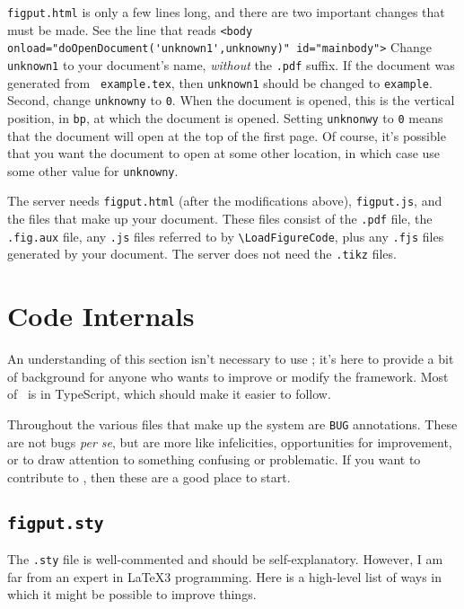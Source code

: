 \documentclass[10pt]{article}
\begin{document}
{\tt figput.html} is only a few lines long, and there are two
important changes that must be made. See the line that reads
\vskip 0.2cm
\noindent\verb!<body onload="doOpenDocument('unknown1',unknowny)" id="mainbody">!
\vskip 0.2cm
\noindent Change {\tt unknown1} to your document's name, \emph{without} the
{\tt .pdf} suffix. If the document was generated from {\tt
example.tex}, then {\tt unknown1} should be changed to {\tt example}.
Second, change {\tt unknowny} to {\tt 0}. When the document is
opened, this is the vertical position, in {\tt bp}, at which the document is
opened. Setting {\tt unknonwy} to {\tt 0} means that the document
will open at the top of the first page. Of course, it's possible
that you want the document to open at some other location, in which
case use some other value for {\tt unknowny}.

The server needs {\tt figput.html} (after the modifications
above), {\tt figput.js}, and the files that make up your
document. These files consist of the {\tt .pdf} file, the {\tt .fig.aux}
file, any {\tt .js} files referred to by \verb=\LoadFigureCode=, plus
any {\tt .fjs} files generated by your document. The server does not
need the {\tt .tikz} files. 

\section{Code Internals}

An understanding of this section isn't necessary to use \figput; it's
here to provide a bit of background for anyone who wants to improve
or modify the framework. Most of \figput\ is in TypeScript, which
should make it easier to follow.

Throughout the various files that make up the system are
{\tt BUG} annotations. These are not bugs \emph{per se}, but are more
like infelicities, opportunities for improvement, or to draw attention
to something confusing or problematic. If you want to contribute to
\figput, then these are a good place to start.

\subsection{\tt figput.sty}

The {\tt .sty} file is well-commented and should be
self-explanatory. However, I am far from an expert in \LaTeX3
programming. Here is a high-level list of ways in which it might be
possible to improve things.
\end{document}

